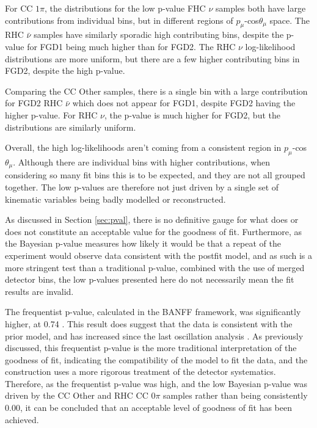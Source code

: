 For CC $1\pi$, the distributions for the low p-value FHC $\nu$ samples both have large contributions from individual bins, but in different regions of $p_{\mu}$-cos$\theta_{\mu}$ space. The RHC $\bar{\nu}$ samples have similarly sporadic high contributing bins, despite the p-value for FGD1 being much higher than for FGD2. The RHC $\nu$ log-likelihood distributions are more uniform, but there are a few higher contributing bins in FGD2, despite the high p-value.

Comparing the CC Other samples, there is a single bin with a large contribution for FGD2 RHC $\bar{\nu}$ which does not appear for FGD1, despite FGD2 having the higher p-value. For RHC $\nu$, the p-value is much higher for FGD2, but the distributions are similarly uniform.

Overall, the high log-likelihoods aren't coming from a consistent region in $p_{\mu}$-cos$\theta_{\mu}$. Although there are individual bins with higher contributions, when considering so many fit bins this is to be expected, and they are not all grouped together.  The low p-values are therefore not just driven by a single set of kinematic variables being badly modelled or reconstructed. 

As discussed in Section \ref{sec:pval}, there is no definitive gauge for what does or does not constitute an acceptable value for the goodness of fit. Furthermore, as the Bayesian p-value measures how likely it would be that a repeat of the experiment would observe data consistent with the postfit model, and as such is a more stringent test than a traditional p-value, combined with the use of merged detector bins, the low p-values presented here do not necessarily mean the fit results are invalid.

The frequentist p-value, calculated in the BANFF framework, was significantly higher, at 0.74 \cite{tn395}. This result does suggest that the data is consistent with the prior model, and has increased since the last oscillation analysis \cite{tn324}. As previously discussed, this frequentist p-value is the more traditional interpretation of the goodness of fit, indicating the compatibility of the model to fit the data, and the construction uses a more rigorous treatment of the detector systematics. Therefore, as the frequentist p-value was high, and the low Bayesian p-value was driven by the CC Other and RHC CC $0\pi$ samples rather than being consistently 0.00, it can be concluded that an acceptable level of goodness of fit has been achieved.


